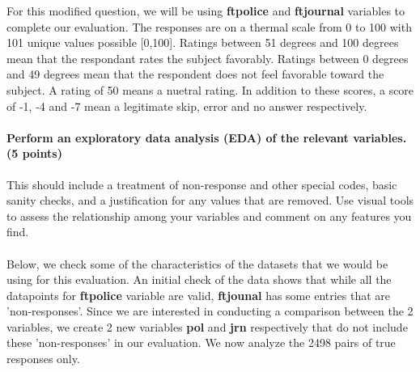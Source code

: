 \documentclass[12pt]{article}
\begin{document}
For this modified question, we will be using \textbf{ftpolice} and \textbf{ftjournal} variables to complete our evaluation. The responses are on a thermal scale from 0 to 100 with 101 unique values possible [0,100]. Ratings between 51 degrees and 100 degrees mean that the respondant rates the subject favorably. Ratings between 0 degrees and 49 degrees mean that the respondent does not feel favorable toward the subject. A rating of 50 means a nuetral rating. In addition to these scores, a score of -1, -4 and -7 mean a legitimate skip, error and no answer respectively.


\paragraph{Perform an exploratory data analysis (EDA) of the relevant variables. (5 points)}
This should include a treatment of non-response and other special codes, basic sanity checks, and a justification for any values that are removed. Use visual tools to assess the relationship among your variables and comment on any features you find.

\paragraph{}
Below, we check some of the characteristics of the datasets that we would be using for this evaluation. An initial check of the data shows that while all the datapoints for \textbf{ftpolice} variable are valid, \textbf{ftjounal} has some entries that are 'non-responses'. Since we are interested in conducting a comparison between the 2 variables, we create 2 new variables \textbf{pol} and \textbf{jrn} respectively that do not include these 'non-responses' in our evaluation. We now analyze the 2498 pairs of true responses only.
\end{document}
